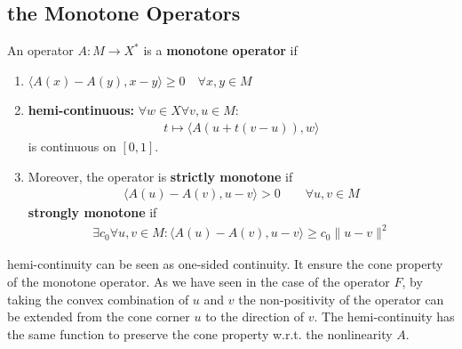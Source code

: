 \subsection{the Monotone Operators}
\begin{definition}
	An operator $A: M \rightarrow X^*$ is a \textbf{monotone operator} if 
	\begin{enumerate}
		\item $\langle A(x) - A(y), x - y \rangle \ge 0 \quad \forall x, y \in M$
		\item \textbf{hemi-continuous:} $\forall w \in X \forall v, u \in M$:
		\begin{align*}
			t \mapsto \langle A(u + t(v - u)), w \rangle 
		\end{align*}
		is continuous on $[0, 1]$.
		\item 
	Moreover, the operator is \textbf{strictly monotone} if 
	\begin{align*}
		\langle A(u) - A(v), u - v \rangle > 0 \qquad \forall u, v \in M
	\end{align*}
	\textbf{strongly monotone} if 
	\begin{align*}
		\exists c_0 \forall u, v \in M : \langle A(u) - A(v), u - v \rangle \ge c_0 \|u - v \|^2 
	\end{align*}
	\end{enumerate}
\end{definition}
hemi-continuity can be seen as one-sided continuity. It ensure the cone property of the monotone operator. As we have seen in the case of the operator $F$, by taking the convex combination of $u$ and $v$ the non-positivity of the operator can be extended from the cone corner $u$ to the direction of $v$. The hemi-continuity has the same function to preserve the cone property w.r.t. the nonlinearity $A$. 

